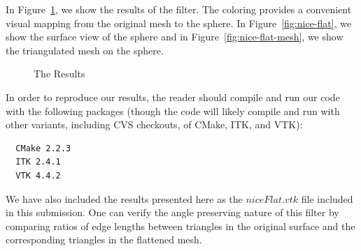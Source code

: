 \documentclass{InsightArticle}
\begin{document}
  In Figure~\ref{fig:results}, we show the results of the filter. The
  coloring provides a convenient visual mapping from the original mesh
  to the sphere. In Figure~\ref{fig:nice-flat}, we show the surface
  view of the sphere and in Figure~\ref{fig:nice-flat-mesh}, we show
  the triangulated mesh on the sphere.

  \begin{figure}[h]
		\begin{center}
    \end{center}
    \vspace{-.25in} \caption{The Results} \label{fig:results}
  \end{figure}  

  In order to reproduce our results, the reader should compile and run
  our code with the following packages (though the code will likely
  compile and run with other variants, including CVS checkouts, of
  CMake, ITK, and VTK):

  \begin{verbatim}
  CMake 2.2.3
  ITK 2.4.1
  VTK 4.4.2
  \end{verbatim}

  We have also included the results presented here as the
  $niceFlat.vtk$ file included in this submission. One can verify the
  angle preserving nature of this filter by comparing ratios of edge
  lengths between triangles in the original surface and the
  corresponding triangles in the flattened mesh.
\end{document}
